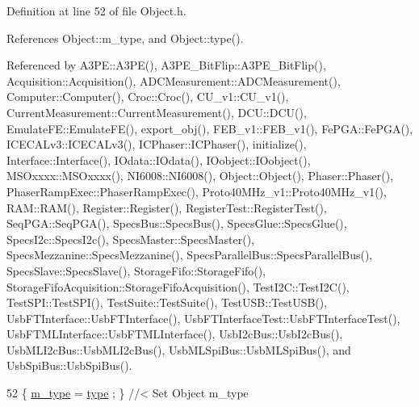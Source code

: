 Definition at line 52 of file Object.\+h.



References Object\+::m\+\_\+type, and Object\+::type().



Referenced by A3\+P\+E\+::\+A3\+P\+E(), A3\+P\+E\+\_\+\+Bit\+Flip\+::\+A3\+P\+E\+\_\+\+Bit\+Flip(), Acquisition\+::\+Acquisition(), A\+D\+C\+Measurement\+::\+A\+D\+C\+Measurement(), Computer\+::\+Computer(), Croc\+::\+Croc(), C\+U\+\_\+v1\+::\+C\+U\+\_\+v1(), Current\+Measurement\+::\+Current\+Measurement(), D\+C\+U\+::\+D\+C\+U(), Emulate\+F\+E\+::\+Emulate\+F\+E(), export\+\_\+obj(), F\+E\+B\+\_\+v1\+::\+F\+E\+B\+\_\+v1(), Fe\+P\+G\+A\+::\+Fe\+P\+G\+A(), I\+C\+E\+C\+A\+Lv3\+::\+I\+C\+E\+C\+A\+Lv3(), I\+C\+Phaser\+::\+I\+C\+Phaser(), initialize(), Interface\+::\+Interface(), I\+Odata\+::\+I\+Odata(), I\+Oobject\+::\+I\+Oobject(), M\+S\+Oxxxx\+::\+M\+S\+Oxxxx(), N\+I6008\+::\+N\+I6008(), Object\+::\+Object(), Phaser\+::\+Phaser(), Phaser\+Ramp\+Exec\+::\+Phaser\+Ramp\+Exec(), Proto40\+M\+Hz\+\_\+v1\+::\+Proto40\+M\+Hz\+\_\+v1(), R\+A\+M\+::\+R\+A\+M(), Register\+::\+Register(), Register\+Test\+::\+Register\+Test(), Seq\+P\+G\+A\+::\+Seq\+P\+G\+A(), Specs\+Bus\+::\+Specs\+Bus(), Specs\+Glue\+::\+Specs\+Glue(), Specs\+I2c\+::\+Specs\+I2c(), Specs\+Master\+::\+Specs\+Master(), Specs\+Mezzanine\+::\+Specs\+Mezzanine(), Specs\+Parallel\+Bus\+::\+Specs\+Parallel\+Bus(), Specs\+Slave\+::\+Specs\+Slave(), Storage\+Fifo\+::\+Storage\+Fifo(), Storage\+Fifo\+Acquisition\+::\+Storage\+Fifo\+Acquisition(), Test\+I2\+C\+::\+Test\+I2\+C(), Test\+S\+P\+I\+::\+Test\+S\+P\+I(), Test\+Suite\+::\+Test\+Suite(), Test\+U\+S\+B\+::\+Test\+U\+S\+B(), Usb\+F\+T\+Interface\+::\+Usb\+F\+T\+Interface(), Usb\+F\+T\+Interface\+Test\+::\+Usb\+F\+T\+Interface\+Test(), Usb\+F\+T\+M\+L\+Interface\+::\+Usb\+F\+T\+M\+L\+Interface(), Usb\+I2c\+Bus\+::\+Usb\+I2c\+Bus(), Usb\+M\+L\+I2c\+Bus\+::\+Usb\+M\+L\+I2c\+Bus(), Usb\+M\+L\+Spi\+Bus\+::\+Usb\+M\+L\+Spi\+Bus(), and Usb\+Spi\+Bus\+::\+Usb\+Spi\+Bus().


\begin{DoxyCode}
52 \{ \hyperlink{classObject_a457a600fe8c00eb1034374f75110a78c}{m\_type}  = \hyperlink{classObject_a84f99f70f144a83e1582d1d0f84e4e62}{type}  ; \} \textcolor{comment}{//< Set Object m\_type}
\end{DoxyCode}
\mbox{\label{classApplication_a48ecc3d76b3f2390ae1ba76d13f8bd54}} 
